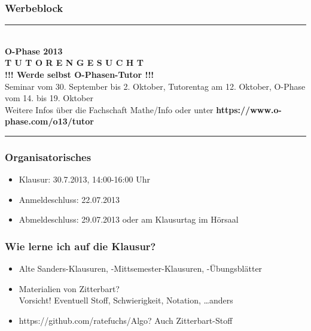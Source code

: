 

\begin{frame}
  \titlepage
\end{frame}

\begin{frame}
\frametitle{Werbeblock}
\begin{center}
\rule{0.9\textwidth}{0.4pt}\\[1cm]
{\bf\LARGE O-Phase 2013}\\[0.5cm]
{\bf\huge T U T O R E N \hspace{0.5em} G E S U C H T}\\[0.4cm] {\bf\large
!!! Werde selbst O-Phasen-Tutor !!!}\\[0.3cm] Seminar vom 30. September bis
2. Oktober, Tutorentag am 12. Oktober, O-Phase vom 14. bis 19. Oktober\\
Weitere Infos über die Fachschaft Mathe/Info oder unter
\textbf{https://www.o-phase.com/o13/tutor} \\[0.5cm]
\rule{0.9\textwidth}{0.4pt} \end{center}
\end{frame}

\begin{frame}
\frametitle{Organisatorisches}
\begin{itemize}
\item Klausur: 30.7.2013, 14:00-16:00 Uhr
\item Anmeldeschluss: 22.07.2013
\item Abmeldeschluss: 29.07.2013 oder am Klausurtag im Hörsaal
\end{itemize}
\end{frame}

\begin{frame}
\frametitle{Wie lerne ich auf die Klausur?}
\begin{itemize}
\item Alte Sanders-Klausuren, -Mittsemester-Klausuren, -Übungsblätter
\item Materialien von Zitterbart?\\
Vorsicht! Eventuell Stoff, Schwierigkeit, Notation, \ldots anders
\item https://github.com/ratefuchs/Algo? Auch Zitterbart-Stoff
\end{itemize}
\end{frame}
